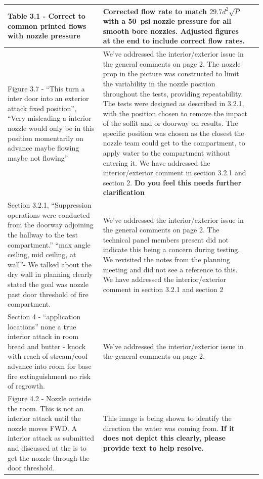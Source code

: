 \documentclass[12pt,oneside]{book}
\begin{document}
\begin{landscape}
\begin{longtable}{|L{4in}|L{3.75in}|c|}
		\hline
		Table 3.1 - Correct to common printed flows with nozzle pressure & 
		Corrected flow rate to match $29.7d^2\sqrt{P}$ with a 50~psi nozzle pressure for all smooth bore nozzles. Adjusted figures at the end to include correct flow rates. & \checkmark \\

		\hline
		Figure 3.7 - ``This turn a inter door into an exterior attack fixed position'', ``Very misleading a interior nozzle would only be in this position momentarily on advance maybe flowing maybe not flowing'' &
		We've addressed the interior/exterior issue in the general comments on page 2. The nozzle prop in the picture was constructed to limit the variability in the nozzle position throughout the tests, providing repeatability. The tests were designed as described in 3.2.1, with the position chosen to remove the impact of the soffit and or doorway on results. The specific position was chosen as the closest the nozzle team could get to the compartment, to apply water to the compartment without entering it. We have addressed the interior/exterior comment in section 3.2.1 and section 2. \textbf{Do you feel this needs further clarification} & \\

		\hline
		Section 3.2.1, ``Suppression operations were conducted from the doorway adjoining the hallway to the test compartment.'' ``max angle ceiling, mid ceiling, at wall''- We talked about the dry wall in planning clearly stated the goal was nozzle past door threshold of fire compartment. &
		We've addressed the interior/exterior issue in the general comments on page 2. The technical panel members present did not indicate this being a concern during testing. We revisited the notes from the planning meeting and did not see a reference to this.  We have addressed the interior/exterior comment in section 3.2.1 and section 2 & \\

		\hline
		Section 4 - ``application locations'' none a true interior attack in room bread and butter - knock with reach of stream/cool advance into room for base fire extinguishment no risk of regrowth. & 
		We've addressed the interior/exterior issue in the general comments on page 2. & \\

		\hline
		Figure 4.2 - Nozzle outside the room. This is not an interior attack until the nozzle moves FWD. A interior attack as submitted and discussed at the is to get the nozzle through the door threshold. & 
		This image is being shown to identify the direction the water was coming from. \textbf{If it does not depict this clearly, please provide text to help resolve.} & \\


\end{longtable}
\end{landscape}
\end{document}
